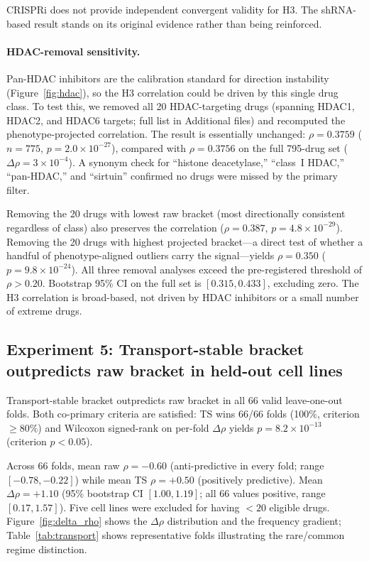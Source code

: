 \documentclass[11pt]{article}
\begin{document}
CRISPRi does not provide independent convergent validity for H3. The
shRNA-based result stands on its original evidence rather than being
reinforced.

\paragraph{HDAC-removal sensitivity.}
Pan-HDAC inhibitors are the calibration standard for direction instability
(Figure~\ref{fig:hdac}), so the H3 correlation could be driven by this
single drug class. To test this, we removed all 20 HDAC-targeting drugs
(spanning HDAC1, HDAC2, and HDAC6 targets; full list in Additional files)
and recomputed the phenotype-projected correlation. The result is
essentially unchanged: $\rho = 0.3759$ ($n = 775$,
$p = 2.0 \times 10^{-27}$), compared with $\rho = 0.3756$ on the full
795-drug set ($\Delta\rho = 3 \times 10^{-4}$). A synonym check for ``histone
deacetylase,'' ``class~I HDAC,'' ``pan-HDAC,'' and ``sirtuin'' confirmed
no drugs were missed by the primary filter.

Removing the 20 drugs with lowest raw bracket (most directionally
consistent regardless of class) also preserves the correlation
($\rho = 0.387$, $p = 4.8 \times 10^{-29}$). Removing the 20 drugs with
highest projected bracket---a direct test of whether a handful of
phenotype-aligned outliers carry the signal---yields $\rho = 0.350$
($p = 9.8 \times 10^{-24}$). All three removal analyses exceed the
pre-registered threshold of $\rho > 0.20$. Bootstrap 95\% CI on the full
set is $[0.315, 0.433]$, excluding zero. The H3 correlation is broad-based,
not driven by HDAC inhibitors or a small number of extreme drugs.

\subsection{Experiment 5: Transport-stable bracket outpredicts raw bracket in held-out cell lines}
\label{sec:exp5}

Transport-stable bracket outpredicts raw bracket in all 66 valid
leave-one-out folds. Both co-primary criteria are satisfied:
TS wins 66/66 folds (100\%, criterion $\geq 80\%$) and Wilcoxon
signed-rank on per-fold $\Delta\rho$ yields $p = 8.2 \times 10^{-13}$
(criterion $p < 0.05$).

Across 66 folds, mean raw $\rho = -0.60$ (anti-predictive in every
fold; range $[-0.78, -0.22]$) while mean TS $\rho = +0.50$ (positively
predictive). Mean $\Delta\rho = +1.10$ (95\% bootstrap CI
$[1.00, 1.19]$; all 66 values positive, range $[0.17, 1.57]$). Five
cell lines were excluded for having $< 20$ eligible drugs.
Figure~\ref{fig:delta_rho} shows the $\Delta\rho$ distribution and the
frequency gradient; Table~\ref{tab:transport} shows representative folds
illustrating the rare/common regime distinction.
\end{document}
